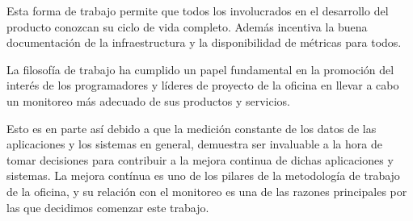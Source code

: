 Esta forma de trabajo permite que todos los involucrados en el desarrollo del
producto conozcan su ciclo de vida completo. Además incentiva la buena
documentación de la infraestructura y la disponibilidad de métricas para todos.

La filosofía de trabajo ha cumplido un papel fundamental en la promoción del
interés de los programadores y líderes de proyecto de la oficina en llevar a
cabo un monitoreo más adecuado de sus productos y servicios.

Esto es en parte así debido a que la medición constante de los datos de las
aplicaciones y los sistemas en general, demuestra ser invaluable a la hora de
tomar decisiones para contribuir a la mejora continua de dichas aplicaciones y
sistemas. La mejora contínua es uno de los pilares de la metodología de trabajo
de la oficina, y su relación con el monitoreo es una de las razones principales
por las que decidimos comenzar este trabajo.

